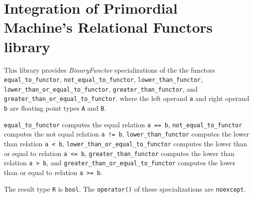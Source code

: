 \section{Integration of Primordial Machine's Relational Functors library}

\noindent{}This library provides \textit{BinaryFunctor}    specializations of the
the functors
\texttt{equal\_to\_functor},
\texttt{not\_equal\_to\_functor},
\texttt{lower\_than\_functor},
\texttt{lower\_than\_or\_equal\_to\_functor},
\texttt{greater\_than\_functor}, and
\texttt{greater\_than\_or\_equal\_to\_functor}.
where the left operand \texttt{a} and right operand \texttt{b} are floating point
types \texttt{A} and \texttt{B}.\newline

\texttt{equal\_to\_functor} computes the equal relation \texttt{a == b},
\texttt{not\_equal\_to\_functor} computes the not equal relation \texttt{a != b},
\texttt{lower\_than\_functor} computes the lower than relation \texttt{a < b},
\texttt{lower\_than\_or\_equal\_to\_functor} computes the lower than or equal to relation \texttt{a <= b},
\texttt{greater\_than\_functor} computes the lower than relation \texttt{a > b}, and
\texttt{greater\_than\_or\_equal\_to\_functor} computes the lower than or equal to relation \texttt{a >= b}.\newline

The result type \texttt{R} is \texttt{bool}.
The \texttt{operator()} of these specializations are \texttt{noexcept}.
